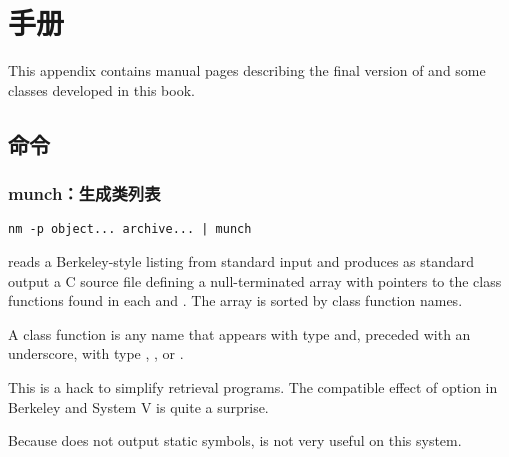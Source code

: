 

\chapter{手册}
\label{apd:Manual}
This appendix contains  manual pages describing the final version
of  and some classes developed in this book.

\section{命令}

\subsection{munch：生成类列表}
\begin{lstlisting}[keywords={nm,munch}]
	nm -p object... archive... | munch
\end{lstlisting}
 reads a Berkeley-style  listing from standard
input and produces as standard output a C source file defining a
null-terminated array  with pointers to the class functions
found in each  and . The array is sorted by
class function names.

A class function is any name that appears with type  and, preceded
with an underscore, with type , , or .

This is a hack to simplify retrieval programs. The compatible effect of
option  in Berkeley and System V  is quite a surprise.

Because   does not output static symbols,
 is not very useful on this system.

